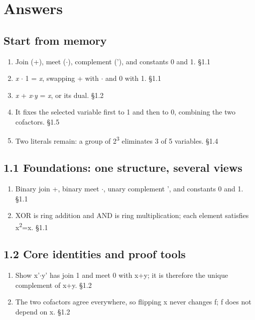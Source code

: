 \documentclass[11pt]{article}
\begin{document}
\clearpage
\section{Answers}
\begin{keepsection}\subsection{Start from memory}

\begin{enumerate}
\item Join (+), meet (\ensuremath{\cdot}), complement ('), and constants 0 and 1. \hfill{\small\color{FAUblue}§1.1}
\item \textit{x} \ensuremath{\cdot} 1 = \textit{x}, swapping + with \ensuremath{\cdot} and 0 with 1. \hfill{\small\color{FAUblue}§1.1}
\item \textit{x} + \textit{x}\ensuremath{\cdot}\textit{y} = \textit{x}, or its dual. \hfill{\small\color{FAUblue}§1.2}
\item It fixes the selected variable first to 1 and then to 0, combining the two cofactors. \hfill{\small\color{FAUblue}§1.5}
\item Two literals remain: a group of 2\textsuperscript{3} eliminates 3 of 5 variables. \hfill{\small\color{FAUblue}§1.4}
\end{enumerate}

\end{keepsection}
\begin{keepsection}\subsection{1.1 Foundations: one structure, several views}

\begin{enumerate}
\item Binary join +, binary meet \ensuremath{\cdot}, unary complement ', and constants 0 and 1. \hfill{\small\color{FAUblue}§1.1}
\item XOR is ring addition and AND is ring multiplication; each element satisfies x\textsuperscript{2}=x. \hfill{\small\color{FAUblue}§1.1}
\end{enumerate}

\end{keepsection}
\begin{keepsection}\subsection{1.2 Core identities and proof tools}

\begin{enumerate}
\item Show x'\ensuremath{\cdot}y' has join 1 and meet 0 with x+y; it is therefore the unique complement of x+y. \hfill{\small\color{FAUblue}§1.2}
\item The two cofactors agree everywhere, so flipping x never changes f; f does not depend on x. \hfill{\small\color{FAUblue}§1.2}
\end{enumerate}

\end{keepsection}
\end{document}
